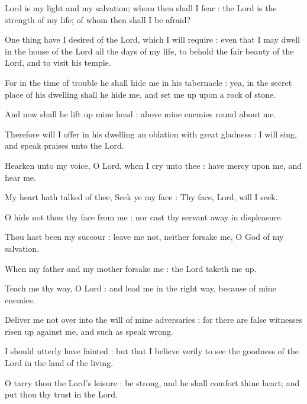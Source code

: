  Lord is my light and my salvation; whom then shall I fear : the Lord is the strength of my life; of whom then shall I be afraid?\par
{}
One thing have I desired of the Lord, which I will require : even that I may dwell in the house of the Lord all the days of my life, to behold the fair beauty of the Lord, and to visit his temple.\par
{}For in the time of trouble he shall hide me in his tabernacle : yea, in the secret place of his dwelling shall he hide me, and set me up upon a rock of stone.\par
{}And now shall he lift up mine head : above mine enemies round about me.\par
{}Therefore will I offer in his dwelling an oblation with great gladness : I will sing, and speak praises unto the Lord.\par
{}Hearken unto my voice, O Lord, when I cry unto thee : have mercy upon me, and hear me.\par
{}My heart hath talked of thee, Seek ye my face : Thy face, Lord, will I seek.\par
{}O hide not thou thy face from me : nor cast thy servant away in displeasure.\par
{}Thou hast been my succour : leave me not, neither forsake me, O God of my salvation.\par
{}When my father and my mother forsake me : the Lord taketh me up.\par
{}Teach me thy way, O Lord : and lead me in the right way, because of mine enemies.\par
{}Deliver me not over into the will of mine adversaries : for there are false witnesses risen up against me, and such as speak wrong.\par
{}I should utterly have fainted : but that I believe verily to see the goodness of the Lord in the land of the living.\par
{}O tarry thou the Lord's leisure : be strong, and he shall comfort thine heart; and put thou thy trust in the Lord.\par

